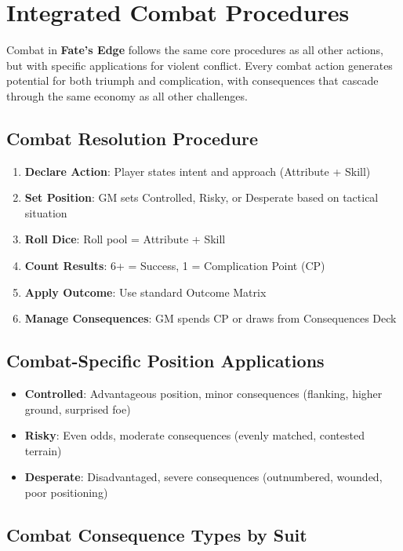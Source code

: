 \section{Integrated Combat Procedures}

Combat in \textbf{Fate's Edge} follows the same core procedures as all other actions, but with specific applications for violent conflict. Every combat action generates potential for both triumph and complication, with consequences that cascade through the same economy as all other challenges.

\subsection{Combat Resolution Procedure}

\begin{enumerate}
    \item \textbf{Declare Action}: Player states intent and approach (Attribute + Skill)
    \item \textbf{Set Position}: GM sets Controlled, Risky, or Desperate based on tactical situation
    \item \textbf{Roll Dice}: Roll pool = Attribute + Skill
    \item \textbf{Count Results}: 6+ = Success, 1 = Complication Point (CP)
    \item \textbf{Apply Outcome}: Use standard Outcome Matrix
    \item \textbf{Manage Consequences}: GM spends CP or draws from Consequences Deck
\end{enumerate}

\subsection{Combat-Specific Position Applications}

\begin{itemize}
    \item \textbf{Controlled}: Advantageous position, minor consequences (flanking, higher ground, surprised foe)
    \item \textbf{Risky}: Even odds, moderate consequences (evenly matched, contested terrain)
    \item \textbf{Desperate}: Disadvantaged, severe consequences (outnumbered, wounded, poor positioning)
\end{itemize}

\subsection{Combat Consequence Types by Suit}


